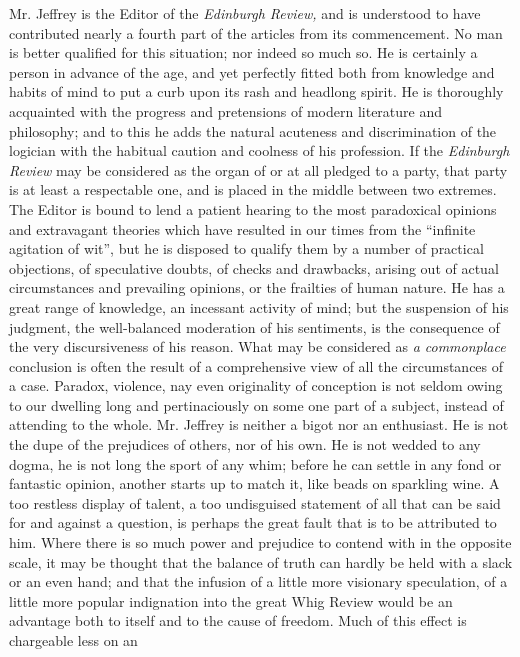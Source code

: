 Mr. Jeffrey is the Editor of the \emph{Edinburgh Review,} and is
understood to have contributed nearly a fourth part of the
articles from its commencement. No man is better qualified for
this situation; nor indeed so much so. He is certainly a person in
advance of the age, and yet perfectly fitted both from knowledge
and habits of mind to put a curb upon its rash and headlong
spirit. He is thoroughly acquainted with the progress and
pretensions of modern literature and philosophy; and to this he
adds the natural acuteness and discrimination of the logician with
the habitual caution and coolness of his profession. If the
\emph{Edinburgh Review} may be considered as the organ of or at
all pledged to a party, that party is at least a respectable one,
and is placed in the middle between two extremes. The Editor is
bound to lend a patient hearing to the most paradoxical opinions
and extravagant theories which have resulted in our times from the
``infinite agitation of wit'', but he is disposed to qualify them
by a number of practical objections, of speculative doubts, of
checks and drawbacks, arising out of actual circumstances and
prevailing opinions, or the frailties of human nature.  He has a
great range of knowledge, an incessant activity of mind; but the
suspension of his judgment, the well-balanced moderation of his
sentiments, is the consequence of the very discursiveness of his
reason.  What may be considered as \emph{a commonplace} conclusion
is often the result of a comprehensive view of all the
circumstances of a case. Paradox, violence, nay even originality
of conception is not seldom owing to our dwelling long and
pertinaciously on some one part of a subject, instead of attending
to the whole. Mr. Jeffrey is neither a bigot nor an enthusiast. He
is not the dupe of the prejudices of others, nor of his own. He is
not wedded to any dogma, he is not long the sport of any whim;
before he can settle in any fond or fantastic opinion, another
starts up to match it, like beads on sparkling wine. A too
restless display of talent, a too undisguised statement of all
that can be said for and against a question, is perhaps the great
fault that is to be attributed to him. Where there is so much
power and prejudice to contend with in the opposite scale, it may
be thought that the balance of truth can hardly be held with a
slack or an even hand; and that the infusion of a little more
visionary speculation, of a little more popular indignation into
the great Whig Review would be an advantage both to itself and to
the cause of freedom. Much of this effect is chargeable less on an
